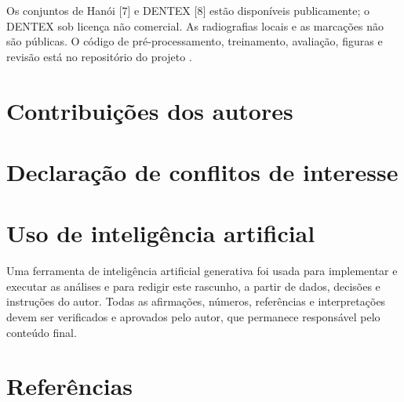 \documentclass[twocolumn]{article}
\begin{document}
Os conjuntos de Hanói [7] e DENTEX [8] estão disponíveis publicamente; o DENTEX sob licença não comercial. As radiografias locais e as marcações não são públicas.  O código de pré-processamento, treinamento, avaliação, figuras e revisão está no repositório do projeto .

\section*{Contribuições dos autores}


\section*{Declaração de conflitos de interesse}


\section*{Uso de inteligência artificial}

Uma ferramenta de inteligência artificial generativa foi usada para implementar e executar as análises e para redigir este rascunho, a partir de dados, decisões e instruções do autor. Todas as afirmações, números, referências e interpretações devem ser verificados e aprovados pelo autor, que permanece responsável pelo conteúdo final.

\balance
\section*{Referências}
\end{document}
